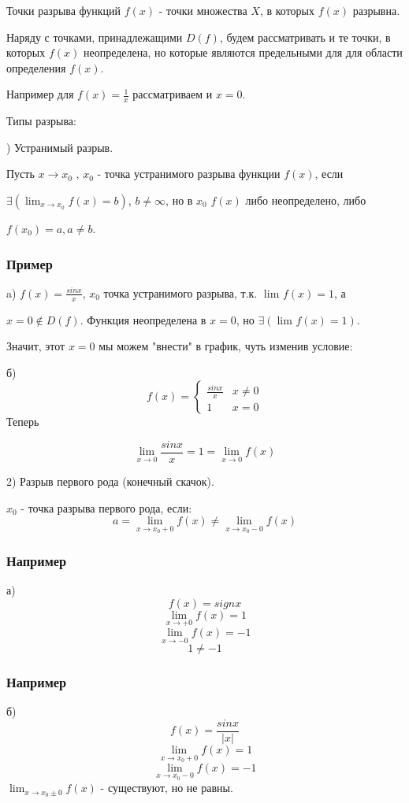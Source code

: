 \opred
Точки разрыва функций $f(x)$ - точки множества $X$, в которых $f(x)$ разрывна.

Наряду с точками, принадлежащими $D(f)$, будем рассматривать и те точки, в которых $f(x)$ неопределена, но которые являются предельными для для области определения $f(x)$.

Например для $f(x)=\frac{1}{x}$ рассматриваем и $x=0$.

Типы разрыва:

) Устранимый разрыв.

Пусть $x \to x_0$ , $x_0$ - точка устранимого разрыва функции $f(x)$, если 

$\exists (\lim_{x \to x_0} f(x) = b)$, $b \neq \infty$, но в $x_0$ $f(x)$ либо неопределено, либо

$f(x_0) = a, a \neq b$.

\subsubsection{Пример}
a) $f(x) = \frac{sin x}{x}$, $x_0$ точка устранимого разрыва, т.к. $\lim_{} f(x) = 1$, а 

$x=0\notin D(f)$. Функция неопределена в $x=0$, но $\exists (\lim_{} f(x) = 1)$.

Значит, этот $x=0$ мы можем "внести" в график, чуть изменив условие:

б)
\begin{equation*}
f(x) = 
 \begin{cases}
   \frac{sin x}{x} &\text{$x \neq 0$}\\
   1 &\text{$x = 0$}
 \end{cases}
\end{equation*}
Теперь

$$\lim_{x \to 0}\frac{sin x}{x} = 1 =\lim_{x \to 0} f(x)$$

2) Разрыв первого рода (конечный скачок).

\opred
$x_0$ - точка разрыва первого рода, если:
$$a=\lim_{x \to x_0 + 0} f(x) \neq \lim_{x \to x_0 - 0} f(x)$$

\subsubsection{Например}
а)
$$f(x) = sign x$$
$$\lim_{x \to + 0} f(x) = 1$$
$$\lim_{x \to - 0} f(x) = -1$$
$$1 \neq -1$$

\subsubsection{Например}
б)
$$f(x) = \frac{sin x}{|x|}$$
$$\lim_{x \to x_0 + 0} f(x) = 1$$
$$\lim_{x \to x_0 - 0} f(x) = -1$$
$\lim_{x \to x_0 \pm  0} f(x)$ - существуют, но не равны.

